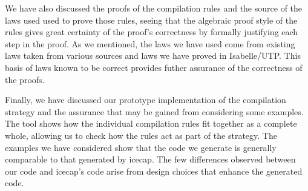 We have also discussed the proofs of the compilation rules and the
source of the laws used used to prove those rules, seeing that the
algebraic proof style of the rules gives great certainty of the
proof's correctness by formally justifying each step in the proof.
As we mentioned, the laws we have used come from existing \Circus{}
laws taken from various sources and laws we have proved in
Isabelle/UTP.
This basis of laws known to be correct provides futher assurance of
the correctness of the proofs.

Finally, we have discussed our prototype implementation of the
compilation strategy and the assurance that may be gained from
considering some examples.
The tool shows how the individual compilation rules fit together as a
complete whole, allowing us to check how the rules act as part of the
strategy.
The examples we have considered show that the code we generate is
generally comparable to that generated by icecap.
The few differences observed between our code and icecap's code arise
from design choices that enhance the generated code.


